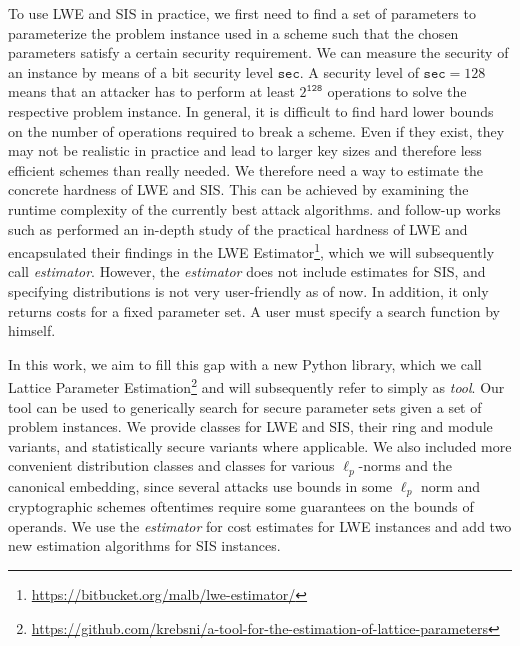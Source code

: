 \documentclass[
  a4paper,  %
  twoside,  %
  bibliography=totoc,
  headsepline,
  cleardoublepage=empty,
  parskip=half,
  draft=false
]{scrbook}
\begin{document}



To use LWE and SIS in practice, we first need to find a set of parameters to parameterize the problem instance used in a scheme such that the chosen parameters satisfy a certain security requirement. We can measure the security of an instance by means of a bit security level $\texttt{sec}$. A security level of $\texttt{sec} = 128$ means that an attacker has to perform at least $2^\texttt{128}$ operations to solve the respective problem instance. In general, it is difficult to find hard lower bounds on the number of operations required to break a scheme. Even if they exist, they may not be realistic in practice and lead to larger key sizes and therefore less efficient schemes than really needed. We therefore need a way to estimate the concrete hardness of LWE and SIS. This can be achieved by examining the runtime complexity of the currently best attack algorithms. \citet{APS15} and follow-up works such as \cite{Alb17,BBGS19} performed an in-depth study of the practical hardness of LWE and encapsulated their findings in the LWE Estimator\footnote{\url{https://bitbucket.org/malb/lwe-estimator/}}, which we will subsequently call \textit{estimator}. However, the \textit{estimator} does not include estimates for SIS, and specifying distributions is not very user-friendly as of now. In addition, it only returns costs for a fixed parameter set. A user must specify a search function by himself.

In this work, we aim to fill this gap with a new Python library, which we call Lattice Parameter Estimation\footnote{\url{https://github.com/krebsni/a-tool-for-the-estimation-of-lattice-parameters}} and will subsequently refer to simply as \textit{tool}. Our tool can be used to generically search for secure parameter sets given a set of problem instances. We provide classes for LWE and SIS, their ring and module variants, and statistically secure variants where applicable. We also included more convenient distribution classes and classes for various $\ell_p$-norms and the canonical embedding, since several attacks use bounds in some $\ell_p$ norm and cryptographic schemes oftentimes require some guarantees on the bounds of operands. We use the \textit{estimator} for cost estimates for LWE instances and add two new estimation algorithms for SIS instances.
\end{document}
